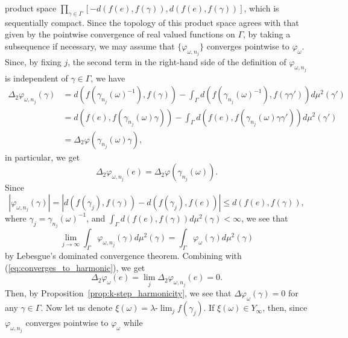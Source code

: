\documentclass[12pt]{amsart}
\numberwithin{equation}{section}
\theoremstyle{plain}
\theoremstyle{definition}
\theoremstyle{remark}
\newcommand{\ulim}{\lambda{\text{-}}\!\lim}
\begin{document}
product space 
$\prod_{\gamma \in \Gamma}[-d(f(e),f(\gamma)),d(f(e),f(\gamma))]$, 
which is sequentially compact. 
Since the topology of this product space agrees with that given
by the pointwise convergence of real valued functions on $\Gamma$,
by taking a subsequence if necessary, we may
assume that $\{\varphi_{\omega,n_j}\}$ converges pointwise to
$\varphi_{\omega}$.
 Since, by fixing $j$, the second term in the right-hand side of the
 definition of $\varphi_{\omega,n_j}$ is independent of 
 $\gamma\in \Gamma$, we have
\begin{equation*}
 \begin{split}
 \Delta_2 \varphi_{\omega,n_j} (\gamma)
 & = d(f(\gamma_{n_j}(\omega)^{-1}), f(\gamma))
 - \int_{\Gamma}
 d(f(\gamma_{n_j}(\omega)^{-1}), f(\gamma \gamma')) d\mu^2(\gamma') \\
 & = d(f(e), f(\gamma_{n_j}(\omega)\gamma)) - 
 \int_{\Gamma}d(f(e), f(\gamma_{n_j}(\omega)\gamma\gamma'))d \mu^2(\gamma') \\
 & = \Delta_2 \varphi(\gamma_{n_j}(\omega)\gamma), 
 \end{split}
\end{equation*}
 in particular, we get
\begin{equation*}
 \Delta_2 \varphi_{\omega, n_j} (e)
 = \Delta_2 \varphi(\gamma_{n_j}(\omega)). 
\end{equation*}
 Since 
\begin{equation*}
 |\varphi_{\omega,n_j}(\gamma)|
 =|d(f(\gamma_j), f(\gamma)) - d(f(\gamma_j), f(e))|
 \leq d(f(e), f(\gamma)), 
\end{equation*}
 where $\gamma_j=\gamma_{n_j}(\omega)^{-1}$, 
 and $\int_{\Gamma} d(f(e),f(\gamma)) d\mu^2(\gamma) < \infty$,
 we see that
\begin{equation*}
 \lim_{j\to \infty} \int_{\Gamma} \varphi_{\omega,n_j}(\gamma)
  d\mu^2(\gamma)
  = \int_{\Gamma} \varphi_{\omega}(\gamma) d\mu^2(\gamma)
\end{equation*}
 by Lebesgue's dominated convergence theorem. 
 Combining with (\ref{eq:converges_to_harmonic}), we get 
\begin{equation*}
 \Delta_2 \varphi_{\omega}(e)
  =\lim_j \Delta_2 \varphi_{\omega,n_j}(e) = 0. 
\end{equation*}
 Then, by Proposition~\ref{prop:k-step_harmonicity}, we see
 that $\Delta \varphi_{\omega}(\gamma)=0$ for any $\gamma \in \Gamma$. 
 Now let us denote $\xi(\omega)=\ulim_j f(\gamma_j)$. 
 If $\xi(\omega) \in Y_{\infty}$, then, since $\varphi_{\omega,n_j}$
 converges pointwise to $\varphi_{\omega}$ while 
\end{document}
